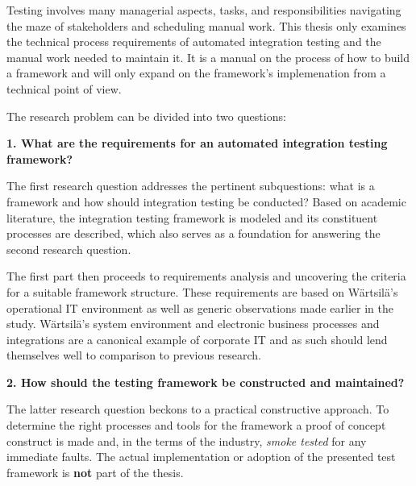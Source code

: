 \documentclass[12pt,a4paper,oneside,pdftex]{report}
\begin{document}
Testing involves many managerial aspects, tasks, and responsibilities navigating the maze of stakeholders and scheduling manual work. This thesis only examines the technical process requirements of automated integration testing and the manual work needed to maintain it. It is a manual on the process of how to build a framework and will only expand on the framework's implemenation from a technical point of view.

The research problem can be divided into two questions: \\

\begin{adjustwidth}{2.5em}{0pt}
\textbf{1. What are the requirements for an automated integration testing framework?} \\
\end{adjustwidth}

The first research question addresses the pertinent subquestions: what is a framework and how should integration testing be conducted? Based on academic literature, the integration testing framework is modeled and its constituent processes are described, which also serves as a foundation for answering the second research question.

The first part then proceeds to requirements analysis and uncovering the criteria for a suitable framework structure. These requirements are based on Wärtsilä's operational IT environment as well as generic observations made earlier in the study. Wärtsilä's system environment and electronic business processes and integrations are a canonical example of corporate IT and as such should lend themselves well to comparison to previous research. \\


\begin{adjustwidth}{2.5em}{0pt}
\textbf{2. How should the testing framework be constructed and maintained?} \\
\end{adjustwidth}

The latter research question beckons to a practical constructive approach. To determine the right processes and tools for the framework a proof of concept construct is made and, in the terms of the industry, \emph{smoke tested} for any immediate faults. The actual implementation or adoption of the presented test framework is \textbf{not} part of the thesis.
\end{document}
